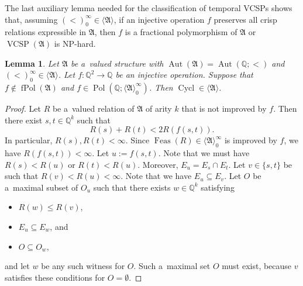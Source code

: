 \documentclass[preprint,12pt]{elsarticle}
\newcommand{\Q}{\mathbb Q}
\newcommand{\bA}{{\mathfrak A}}
\newcommand{\checked}[1]{#1}
\DeclareMathOperator{\Cyc}{Cycl}
\DeclareMathOperator{\Aut}{Aut}
\DeclareMathOperator{\fPol}{fPol}
\DeclareMathOperator{\VCSP}{VCSP}
\DeclareMathOperator{\Pol}{Pol}
\DeclareMathOperator{\Feas}{Feas}
\newtheorem{lemma}[theorem]{Lemma}
\begin{document}
\checked{The last auxiliary lemma needed for the classification of temporal VCSPs shows that, assuming $(<)_0^\infty \in \langle \bA \rangle$, if an injective operation $f$ preserves all crisp relations expressible in $\bA$, then $f$ is a fractional polymorphism of $\bA$ or  $\VCSP(\bA)$ is NP-hard.}

\begin{lemma}\label{lem:lex-viol-soft}
Let $\bA$ be a~valued structure with $\Aut(\bA)=\Aut(\Q;<)$ and $(<)_0^\infty \in \langle \bA \rangle$. \checked{Let $f \colon \Q^2 \to \Q$ be an injective operation.} Suppose that $\checked{f} \notin \fPol(\bA)$ and $\checked{f} \in \Pol(\Q; \langle \bA \rangle_0^\infty)$. Then $\Cyc \in \langle \bA \rangle$. 
\end{lemma}

\begin{proof}
Let $R$ be a~valued relation of $\bA$ of arity $k$ that is not improved by $\checked{f}$. Then there exist $s,t \in \Q^k$ such that
\[R(s)+R(t) < 2 R(\checked{f}(s,t)).\]
In particular, $R(s), R(t) < \infty$. Since $\Feas(R) \in \langle \bA \rangle_0^\infty$ is improved by $\checked{f}$, we have $R(\checked{f}(s,t)) < \infty$.
%
Let $u := \checked{f}(s,t)$. 
Note that we must have $R(s) < R(u)$ or $R(t) < R(u)$. Moreover, $E_u = E_s \cap E_t$. Let $v \in \{s,t\}$ be such that $R(v) < R(u) < \infty$. Note that we have $E_u \subseteq E_v$.
Let $O$ be a~maximal subset of $O_u$ such that there exists $w \in \Q^k$ satisfying
\begin{itemize}
    \item $R(w) \leq R(v)$, 
    \item $E_u \subseteq E_w$, and
    \item $O \subseteq O_w$,
\end{itemize}
and let $w$ be any such witness for $O$. Such a~maximal set $O$ must exist, because $v$ satisfies these conditions for $O = \emptyset$.


\end{proof}
\end{document}
